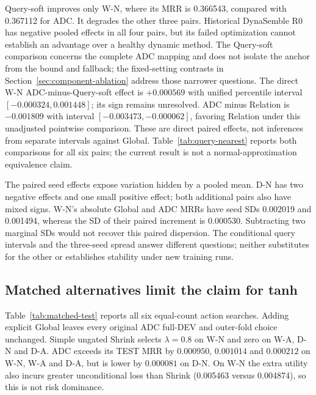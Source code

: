 \documentclass[11pt,a4paper]{article}
\begin{document}
Query-soft improves only W-N, where its MRR is 0.366543, compared with 0.367112 for ADC. It degrades the other three pairs. Historical DynaSemble R0 has negative pooled effects in all four pairs, but its failed optimization cannot establish an advantage over a healthy dynamic method. The Query-soft comparison concerns the complete ADC mapping and does not isolate the anchor from the bound and fallback; the fixed-setting contrasts in Section~\ref{sec:component-ablation} address those narrower questions.
The direct W-N ADC-minus-Query-soft effect is $+0.000569$ with unified percentile interval $[-0.000324,0.001448]$; its sign remains unresolved. ADC minus Relation is $-0.001809$ with interval $[-0.003473,-0.000062]$, favoring Relation under this unadjusted pointwise comparison. These are direct paired effects, not inferences from separate intervals against Global. Table~\ref{tab:query-nearest} reports both comparisons for all six pairs; the current result is not a normal-approximation equivalence claim.



The paired seed effects expose variation hidden by a pooled mean. D-N has two negative effects and one small positive effect; both additional pairs also have mixed signs. W-N's absolute Global and ADC MRRs have seed SDs 0.002019 and 0.001494, whereas the SD of their paired increment is 0.000530. Subtracting two marginal SDs would not recover this paired dispersion. The conditional query intervals and the three-seed spread answer different questions; neither substitutes for the other or establishes stability under new training runs.


\subsection{Matched alternatives limit the claim for tanh}
\label{sec:matched-results}
Table~\ref{tab:matched-test} reports all six equal-count action searches. Adding explicit Global leaves every original ADC full-DEV and outer-fold choice unchanged. Simple ungated Shrink selects $\lambda=0.8$ on W-N and zero on W-A, D-N and D-A. ADC exceeds its TEST MRR by $0.000950$, $0.001014$ and $0.000212$ on W-N, W-A and D-A, but is lower by $0.000081$ on D-N. On W-N the extra utility also incurs greater unconditional loss than Shrink (0.005463 versus 0.004874), so this is not risk dominance.
\end{document}
